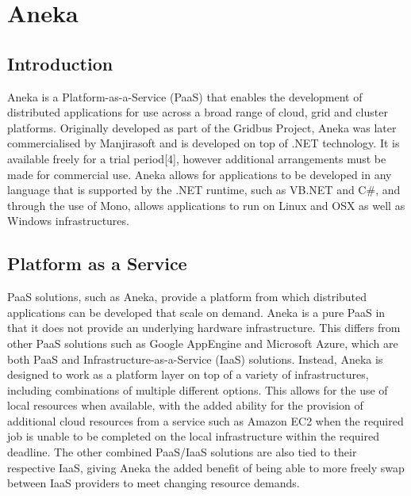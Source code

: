 \chapter{Aneka}
\section{Introduction}
Aneka is a Platform-as-a-Service (PaaS) that enables the development of distributed applications for use across a broad range of cloud, grid and cluster platforms. Originally developed as part of the Gridbus Project, Aneka was later commercialised by Manjirasoft and is developed on top of .NET technology. It is available freely for a trial period[4], however additional arrangements must be made for commercial use. Aneka allows for applications to be developed in any language that is supported by the .NET runtime, such as VB.NET and C\#, and through the use of Mono, allows applications to run on Linux and OSX as well as Windows infrastructures\cite{Aneka}.

\section{Platform as a Service}
PaaS solutions, such as Aneka, provide a platform from which distributed applications can be developed that scale on demand\cite{CloudBus}. Aneka is a pure PaaS in that it does not provide an underlying hardware infrastructure. This differs from other PaaS solutions such as Google AppEngine and Microsoft Azure, which are both PaaS and Infrastructure-as-a-Service (IaaS) solutions. Instead, Aneka is designed to work as a platform layer on top of a variety of infrastructures, including combinations of multiple different options. This allows for the use of local resources when available, with the added ability for the provision of additional cloud resources from a service such as Amazon EC2 when the required job is unable to be completed on the local infrastructure within the required deadline. The other combined PaaS/IaaS solutions are also tied to their respective IaaS, giving Aneka the added benefit of being able to more freely swap between IaaS providers to meet changing resource demands.

